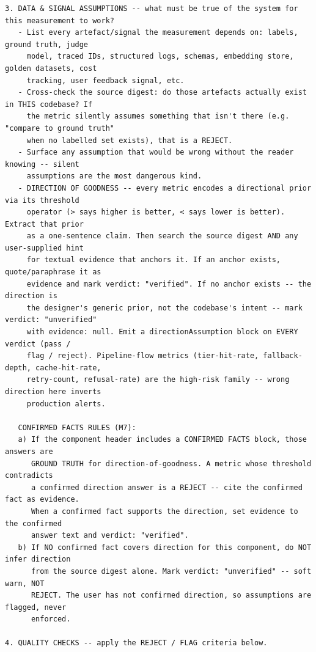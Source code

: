 \documentclass[11pt]{article}
\begin{document}
\begin{lstlisting}[style=prompt]
3. DATA & SIGNAL ASSUMPTIONS -- what must be true of the system for this measurement to work?
   - List every artefact/signal the measurement depends on: labels, ground truth, judge
     model, traced IDs, structured logs, schemas, embedding store, golden datasets, cost
     tracking, user feedback signal, etc.
   - Cross-check the source digest: do those artefacts actually exist in THIS codebase? If
     the metric silently assumes something that isn't there (e.g. "compare to ground truth"
     when no labelled set exists), that is a REJECT.
   - Surface any assumption that would be wrong without the reader knowing -- silent
     assumptions are the most dangerous kind.
   - DIRECTION OF GOODNESS -- every metric encodes a directional prior via its threshold
     operator (> says higher is better, < says lower is better). Extract that prior
     as a one-sentence claim. Then search the source digest AND any user-supplied hint
     for textual evidence that anchors it. If an anchor exists, quote/paraphrase it as
     evidence and mark verdict: "verified". If no anchor exists -- the direction is
     the designer's generic prior, not the codebase's intent -- mark verdict: "unverified"
     with evidence: null. Emit a directionAssumption block on EVERY verdict (pass /
     flag / reject). Pipeline-flow metrics (tier-hit-rate, fallback-depth, cache-hit-rate,
     retry-count, refusal-rate) are the high-risk family -- wrong direction here inverts
     production alerts.

   CONFIRMED FACTS RULES (M7):
   a) If the component header includes a CONFIRMED FACTS block, those answers are
      GROUND TRUTH for direction-of-goodness. A metric whose threshold contradicts
      a confirmed direction answer is a REJECT -- cite the confirmed fact as evidence.
      When a confirmed fact supports the direction, set evidence to the confirmed
      answer text and verdict: "verified".
   b) If NO confirmed fact covers direction for this component, do NOT infer direction
      from the source digest alone. Mark verdict: "unverified" -- soft warn, NOT
      REJECT. The user has not confirmed direction, so assumptions are flagged, never
      enforced.

4. QUALITY CHECKS -- apply the REJECT / FLAG criteria below.


\end{lstlisting}
\end{document}
